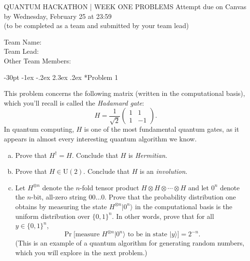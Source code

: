 \documentclass[10pt, cm]{article}
\makeatletter
\renewcommand\section{\@startsection {section}{1}{\z@}
{-30pt \@plus -1ex \@minus -.2ex}
{2.3ex \@plus.2ex}
{\center\normalfont\normalsize\bfseries}}
\newcommand{\problem}[1]{\section*{\smalltt Problem #1}}
\newcommand{\solution}{\hspace{-0.4cm}\hrulefill \vspace{0.4cm}}
\newcommand{\U}{\mathrm{U}}		%
\renewcommand{\ket}[1]{|#1\rangle}		%
\makeatother
\begin{document}
\begin{center}
\uppercase{\smalltt Quantum Hackathon | Week One Problems}
\vskip 30pt
{\smalltt Attempt due on Canvas by Wednesday, February 25 at 23:59}\\
{\smalltt (to be completed as a team and submitted by your team lead)}\\
\vskip 30pt
\end{center}
{\noindent \smalltt Team Name: \hfill \ }\\
\vskip 30pt
{\noindent \smalltt Team Lead: }\\
\vskip 30pt
{\noindent \smalltt Other Team Members: }\\

\pagestyle{myheadings} 
\thispagestyle{empty} 

\small

\newpage

\problem{1}

This problem concerns the following matrix (written in the computational basis), which you'll recall is called the \emph{Hadamard gate}:
$$
H = \frac{1}{\sqrt{2}}
\begin{pmatrix}
1 & 1\\
1 & -1
\end{pmatrix}.
$$
In quantum computing, $H$ is one of the most fundamental quantum gates, as it appears in almost every interesting quantum algorithm we know.

\begin{enumerate}[(a)]
\item Prove that $H^\dagger = H$. Conclude that $H$ is \emph{Hermitian}.
\item Prove that $H \in \U(2)$. Conclude that $H$ is an \emph{involution}.
\item Let $H^{\otimes n}$ denote the $n$-fold tensor product $H \otimes H \otimes \cdots \otimes H$ and let $0^n$ denote the $n$-bit, all-zero string $00\dots 0$. Prove that the probability distribution one obtains by measuring the state $H^{\otimes n}\ket{0^n}$ in the computational basis is the uniform distribution over $\{0,1\}^n$. In other words, prove that for all $y \in \{0,1\}^n$, 
$$
\Pr\big[\text{measure $H^{\otimes n}\ket{0^n}$ to be in state $\ket{y}$}\big] = 2^{-n}.
$$
(This is an example of a quantum algorithm for generating random numbers, which you will explore in the next problem.)
\end{enumerate}

\solution
\end{document}
